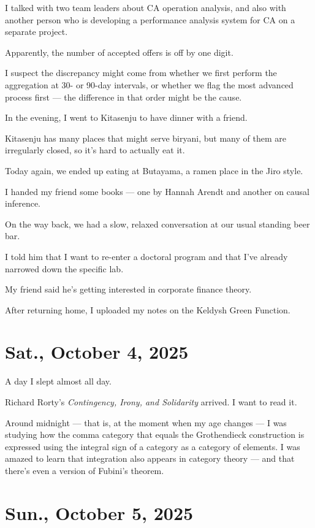 \documentclass[uplatex]{jsarticle}
\begin{document}
I talked with two team leaders about CA operation analysis,  
and also with another person who is developing a performance analysis system for CA on a separate project.

Apparently, the number of accepted offers is off by one digit.

I suspect the discrepancy might come from whether we first perform the aggregation at 30- or 90-day intervals, or whether we flag the most advanced process first — the difference in that order might be the cause.

In the evening, I went to Kitasenju to have dinner with a friend.

Kitasenju has many places that might serve biryani,  
but many of them are irregularly closed, so it's hard to actually eat it.

Today again, we ended up eating at Butayama, a ramen place in the Jiro style.

I handed my friend some books — one by Hannah Arendt and another on causal inference.

On the way back, we had a slow, relaxed conversation at our usual standing beer bar.

I told him that I want to re-enter a doctoral program and that I've already narrowed down the specific lab.

My friend said he's getting interested in corporate finance theory.

After returning home, I uploaded my notes on the Keldysh Green Function.



\section{Sat., October 4, 2025}

A day I slept almost all day.

Richard Rorty's \textit{Contingency, Irony, and Solidarity} arrived. I want to read it.

Around midnight — that is, at the moment when my age changes —  
I was studying how the comma category that equals the Grothendieck construction  
is expressed using the integral sign of a category as a category of elements.  
I was amazed to learn that integration also appears in category theory —  
and that there's even a version of Fubini's theorem.



\section{Sun., October 5, 2025}
\end{document}
